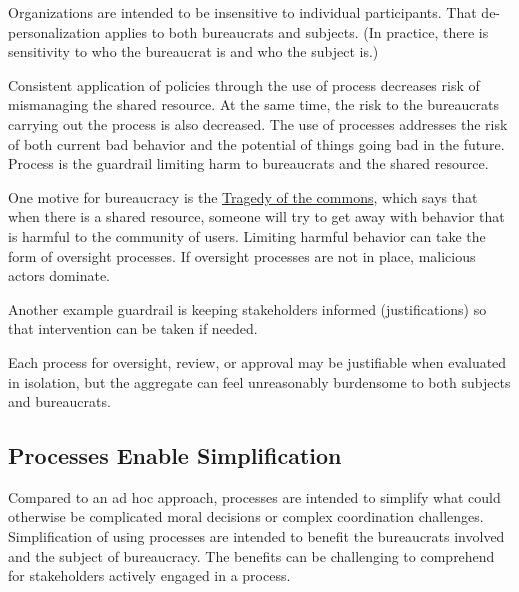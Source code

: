 Organizations are intended to be insensitive to individual participants. That de-personalization applies to both bureaucrats and subjects. (In practice, there is sensitivity to who the bureaucrat is and who the subject is.) 


Consistent application of policies through the use of process decreases risk of mismanaging the shared resource. At the same time, the risk to the bureaucrats carrying out the process is also decreased.
The use of processes addresses the risk of both current bad behavior and the potential of things going bad in the future. Process is the guardrail limiting harm to bureaucrats and the shared resource. 

One motive for bureaucracy is the \href{https://en.wikipedia.org/wiki/Tragedy_of_the_commons}{Tragedy of the commons}, 
which says that when there is a shared resource, someone will try to get away with behavior that is harmful to the community of users. Limiting harmful behavior can take the form of oversight processes. If oversight processes are not in place, malicious actors dominate.


Another example guardrail is keeping stakeholders informed (justifications) so that intervention can be taken if needed. 

Each process for oversight, review, or approval may be justifiable when evaluated in isolation, but the aggregate can feel unreasonably burdensome to both subjects and bureaucrats.





\subsection*{Processes Enable Simplification}
Compared to an ad hoc approach, processes are intended to simplify what could otherwise be complicated moral decisions or complex coordination challenges. 
Simplification of using processes are intended to benefit the bureaucrats involved and the subject of bureaucracy. The benefits can be challenging to comprehend for stakeholders actively engaged in a process. 


